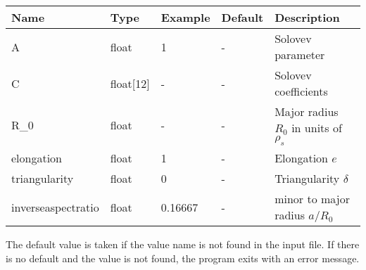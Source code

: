 \begin{longtable}{llll>{\RaggedRight}p{7cm}}
\toprule
\rowcolor{gray!50}\textbf{Name} &  \textbf{Type} & \textbf{Example} & \textbf{Default} & \textbf{Description}  \\ \midrule
    A      & float & 1 &  - & Solovev parameter \\
    C      & float[12] &  - & - & Solovev coefficients \\
    R\_0   & float & - & -  & Major radius $R_0$ in units of $\rho_s$ \\
    elongation    & float & 1 & - & Elongation $e$ \\
    triangularity & float & 0 & - & Triangularity $\delta$ \\
    inverseaspectratio & float & 0.16667 & - & minor to major radius $a/R_0$ \\
\bottomrule
\end{longtable}
The default value is taken if the value name is not found in the input file. If there is no default and
the value is not found,
the program exits with an error message.

